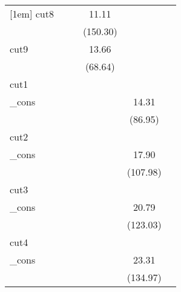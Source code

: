 {\begin{tabular}{l*{5}{c}}
[1em]
cut8        &                     &                     &       11.11\sym{***}&                     &                     \\
            &                     &                     &    (150.30)         &                     &                     \\
[1em]
cut9        &                     &                     &       13.66\sym{***}&                     &                     \\
            &                     &                     &     (68.64)         &                     &                     \\
\hline
cut1        &                     &                     &                     &                     &                     \\
\_cons      &                     &                     &                     &       14.31\sym{***}&                     \\
            &                     &                     &                     &     (86.95)         &                     \\
\hline
cut2        &                     &                     &                     &                     &                     \\
\_cons      &                     &                     &                     &       17.90\sym{***}&                     \\
            &                     &                     &                     &    (107.98)         &                     \\
\hline
cut3        &                     &                     &                     &                     &                     \\
\_cons      &                     &                     &                     &       20.79\sym{***}&                     \\
            &                     &                     &                     &    (123.03)         &                     \\
\hline
cut4        &                     &                     &                     &                     &                     \\
\_cons      &                     &                     &                     &       23.31\sym{***}&                     \\
            &                     &                     &                     &    (134.97)         &                     \\

\end{tabular}}
